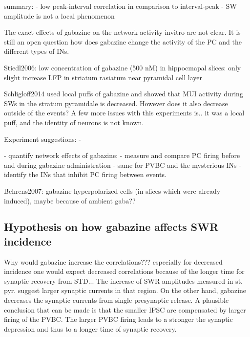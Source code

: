   summary:
    - low peak-interval correlation in comparison to interval-peak
    - SW amplitude is not a local phenomenon

  The exact effects of gabazine on the network activity invitro are not clear.
  It is still an open question how does gabazine change the activity of the PC and the different
  types of INs. 

  Stiedl2006: low concentration of gabazine (500 nM) in hippocmapal slices: only slight increase LFP in striatum rasiatum near pyramidal cell layer

  Schligloff2014 used local puffs of gabazine and showed that MUI activity during SWs in the stratum pyramidale is decreased. However does it also decrease outside of the events? A few more issues with this experiments is.. it was a local puff, and the identity of neurons is not known.

  Experiment suggestions: -

    - quantify network effects of gabazine:
      - measure and compare PC firing before and during gabazine administration
      - same for PVBC and the mysterious INs
    - identify the INs that inhibit PC firing between events.

    Behrens2007: gabazine hyperpolarized cells (in slices which were already induced), 
maybe because of ambient gaba??
  \subsection{Hypothesis on how gabazine affects SWR incidence} 

  
    Why would gabazine increase the correlations??? especially for decreased
    incidence one would expect decreased correlations because of the longer
    time for synaptic recovery from STD...  The increase of SWR amplitudes
    measured in st. pyr. suggest larger synaptic currents in that region. On
    the other hand, gabazine decreases the synaptic currents from single
    presynaptic release. A plausible conclusion that can be made is that the
    smaller IPSC are compensated by larger firing of the PVBC. The larger PVBC
    firing leads to a stronger the synaptic depression and thus to a longer
    time of synaptic recovery. 


